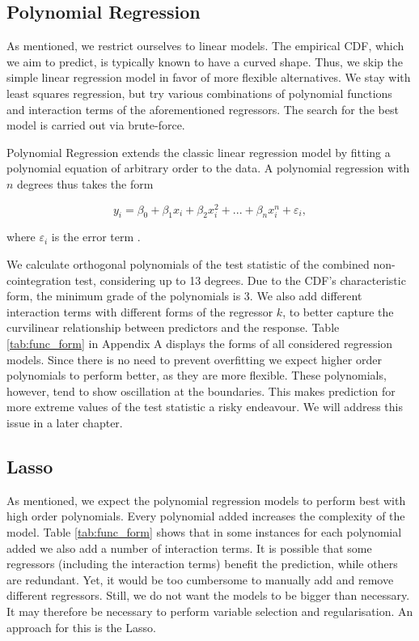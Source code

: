 \documentclass[12pt,a4paper]{article}
\begin{document}
\hypertarget{polynomial-regression}{%
\subsection{Polynomial Regression}\label{polynomial-regression}}

As mentioned, we restrict ourselves to linear models. The empirical
\ac{CDF}, which we aim to predict, is typically known to have a curved
shape. Thus, we skip the simple linear regression model in favor of more
flexible alternatives. We stay with least squares regression, but try
various combinations of polynomial functions and interaction terms of
the aforementioned regressors. The search for the best model is carried
out via brute-force.

Polynomial Regression extends the classic linear regression model by
fitting a polynomial equation of arbitrary order to the data. A
polynomial regression with \(n\) degrees thus takes the form

\begin{equation}
    y_i = \beta_0 + \beta_1 x_i + \beta_2 x_i^2 + ... + \beta_n x_i^n + \varepsilon_i,
\label{eq:7}
\end{equation}

where \(\varepsilon_i\) is the error term \autocite{James_2013}.

We calculate orthogonal polynomials of the test statistic of the
combined non-cointegration test, considering up to 13 degrees. Due to
the \ac{CDF}'s characteristic form, the minimum grade of the polynomials
is 3. We also add different interaction terms with different forms of
the regressor \(k\), to better capture the curvilinear relationship
between predictors and the response. Table \ref{tab:func_form} in
Appendix A displays the forms of all considered regression models. Since
there is no need to prevent overfitting we expect higher order
polynomials to perform better, as they are more flexible. These
polynomials, however, tend to show oscillation at the boundaries. This
makes prediction for more extreme values of the test statistic a risky
endeavour. We will address this issue in a later chapter.

\hypertarget{section}{%
\subsection{\texorpdfstring{\ac{Lasso}}{}}\label{section}}

As mentioned, we expect the polynomial regression models to perform best
with high order polynomials. Every polynomial added increases the
complexity of the model. Table \ref{tab:func_form} shows that in some
instances for each polynomial added we also add a number of interaction
terms. It is possible that some regressors (including the interaction
terms) benefit the prediction, while others are redundant. Yet, it would
be too cumbersome to manually add and remove different regressors.
Still, we do not want the models to be bigger than necessary. It may
therefore be necessary to perform variable selection and regularisation.
An approach for this is the \ac{Lasso}.
\end{document}
